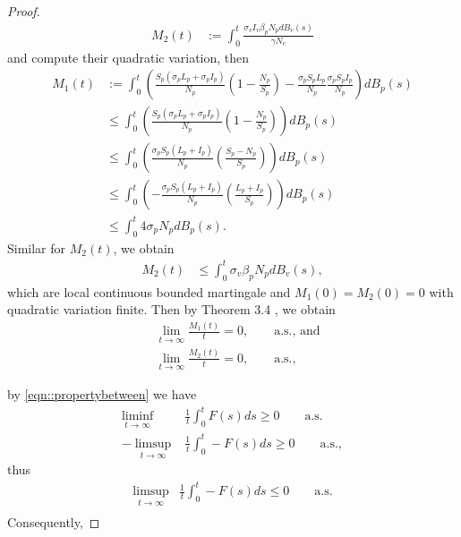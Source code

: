 \begin{proof}
\begin{align*}
	 	M_2(t)&:=
	 		\int_{0} ^ {t}
	 			\frac{
	 				\sigma_v I_v 
	 				\beta_p N_p
	 				 dB_v(s)
	 			}{\gamma N_v}
	\end{align*}
%
 	and compute their quadratic variation, then
	\begin{align*}
	 	M_1(t)
	 	&:=
	 		\int_{0}^{t}
	 			\left( 			
	 		 	\frac{
	 		 		S_p
	 		 		\left(
	 		 			\sigma_p L_p + 
	 		 			\sigma_p I_p 
	 		 		\right)
	 		 	}{N_p}
	 		 	\left(
	 		 		1 - \frac{N_p}{S_p} 
	 		 	\right) -
	 		 	\frac{\sigma_p S_p L_p}{N_p}
	 		 	\frac{\sigma_p S_p I_p}{N_p}
	 			\right)
	 		 dB_p(s)
	 	\\
	 	&\leq
	 		\int_{0}^{t}
	 		\left( 
	 			\frac{
	 				S_p
	 				\left(
	 					\sigma_p L_p +
	 					\sigma_p I_p 
	 				\right)
	 			}{N_p}
	 			\left( 
	 				1 - 
	 				\frac{N_p}{S_p} 
	 			\right) 
	 		\right) dB_p(s)
	 	\\
	 	&\leq
	 		\int_{0}^{t}
	 		\left( 
	 			\frac{
	 				\sigma_p S_p
	 				\left(
	 					L_p + I_p
	 				\right)
	 			}{N_p}
	 			\left(
	 				\frac{S_p-N_p}{S_p} 
	 			\right) 
	 		\right) 
	 		dB_p(s)
	 	\\
	 	&\leq
	 		\int_{0}^{t}
	 		\left(
	 		 	-
	 		 	\frac{
	 		 		\sigma_p S_p
	 		 		\left(
	 		 			 L_p + I_p 
	 		 		\right)
	 		 	}{N_p}
	 		 	\left(
	 		 		\frac{L_p + I_p}{S_p}
	 		 	\right) 
	 		 \right) dB_p(s)
	 	\\
	 	&\leq
	 		\int_{0}^{t}
	 		4\sigma_p N_p dB_p(s).
	\end{align*}
	Similar for $M_2(t)$, we obtain
	 \begin{align*}
	 	M_2(t) &\leq
	 		\int_{0}^{t}\sigma_v \beta_p N_p dB_v(s),
	\end{align*}
	which are local continuous bounded martingale and $M_1(0)=M_2(0)=0$ with 
	quadratic variation finite. Then by Theorem 3.4 \cite[see][p.12]{Mao2008}, we 
	obtain
	 \begin{align*}
	    &\lim
	 	         \limits_{t \to \infty}
	 		    \frac{M_1(t)}{t} = 0,
	 	    	\qquad \mbox{a.s., and}\\
 	    &\lim 
	 	    	\limits_{t\to \infty}
	 		    \frac{M_2(t)}{t} = 0,
	 		    \qquad \mbox{a.s.,}
	 \end{align*}

	by \autoref{eqn::propertybetween} we have 
	\begin{align*}
	 	\liminf
	 	\limits_{t \to \infty} & 
	 	\frac{1}{t}
	 	\int_{0}^{t}
	 		F(s)ds 
	 	\geq 0 \qquad \mbox{a.s.}
	 	\\
	 	-\limsup_{t\to\infty}
	 	&
	 		\frac{1}{t}
	 		\int_{0} ^ {t}
	 			-F(s) ds \geq 
	 			0\qquad \mbox{a.s.},
	\end{align*}
	thus
	\begin{align*}
	 	\limsup_{t\to \infty}
	 	&
	 		\frac{1}{t}
	 		\int_{0} ^ {t} - 
	 		F(s)ds \leq 0
	 		\qquad \mbox{a.s.}
	 	\\
	\end{align*}
	Consequently,


\end{proof}
